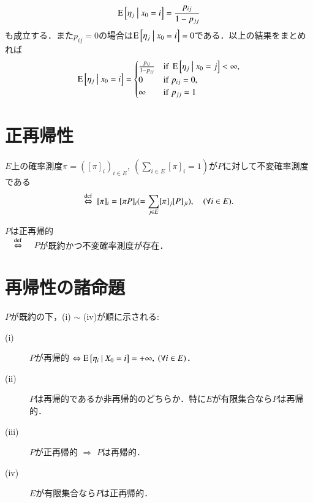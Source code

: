 \begin{prf}
\begin{align}
			\operatorname{E} \left[ \eta_j \ \middle|\ x_0 = i \right] = \frac{p_{ij}}{1 - p_{jj}}
		\end{align}
		も成立する．また$p_{ij} = 0$の場合は$\operatorname{E} \left[ \eta_j \ \middle|\ x_0 = i \right] = 0$である．以上の結果をまとめれば
		\begin{align}
			\cexp{\eta_j}{x_0 = i} = \begin{cases}
				\frac{p_{ij}}{1 - p_{jj}} & {\rm if}\ \cexp{\eta_j}{x_0 = j} < \infty, \\
				0 & {\rm if}\ p_{ij} = 0, \\
				\infty & {\rm if}\ p_{jj} = 1
			\end{cases}
		\end{align}
		\QED
	\end{prf}

\section{正再帰性}
	\begin{dfn}[不変確率測度]
		$E$上の確率測度$\pi = ([\pi]_i)_{i \in E},\ (\sum_{i \in E} [\pi]_i = 1)$が$P$に対して不変確率測度である
		\begin{align}
			\overset{\mathrm{def}}{\Leftrightarrow}\ [\pi]_i = [\pi P]_i ( = \sum_{j \in E}[\pi]_j [P]_{ji} ), \quad (\forall i \in E).
		\end{align}
	\end{dfn}
	\begin{dfn}[正再帰性]
		$P$は正再帰的 \\
		$\quad\overset{\mathrm{def}}{\Leftrightarrow}\quad$ $P$が既約かつ不変確率測度が存在． 
	\end{dfn}
\section{再帰性の諸命題}
	\begin{prp}
		$P$が既約の下，(i) $\sim$ (iv)が順に示される:
		\begin{description}
			\item[\rm{(i)}] $P$が再帰的 $\Leftrightarrow \operatorname{E} \left[ \eta_i \ \middle|\ X_0 = i \right] = +\infty, \ (\forall i \in E)$．
			\item[\rm{(ii)}] $P$は再帰的であるか非再帰的のどちらか．特に$E$が有限集合なら$P$は再帰的．
			\item[\rm{(iii)}] $P$が正再帰的 $\Rightarrow$ $P$は再帰的．
			\item[\rm{(iv)}] $E$が有限集合なら$P$は正再帰的．
		\end{description}
	\end{prp}

